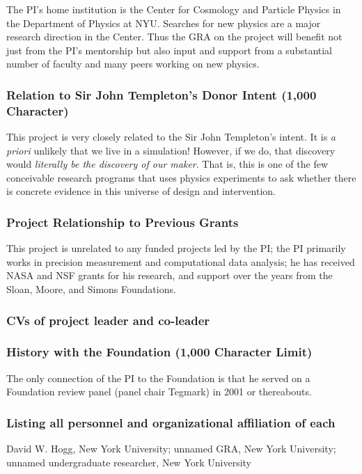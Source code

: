 \documentclass[12pt]{article}
\begin{document}
The PI's home institution is the Center for Cosmology and Particle Physics in the Department of Physics at NYU.
Searches for new physics are a major research direction in the Center.
Thus the GRA on the project will benefit not just from the PI's mentorship but also input and support from a substantial number of faculty and many peers working on new physics.

\subsubsection*{Relation to Sir John Templeton's Donor Intent (1,000 Character)}
This project is very closely related to the Sir John Templeton's intent.
It is \textsl{a priori} unlikely that we live in a simulation!
However, if we do, that discovery would \emph{literally be the discovery of our maker}.
That is, this is one of the few conceivable research programs that uses physics experiments to ask whether there is concrete evidence in this universe of design and intervention.

\subsubsection*{Project Relationship to Previous Grants}
This project is unrelated to any funded projects led by the PI;
the PI primarily works in precision measurement and computational data analysis; he has received NASA and NSF grants for his research, and support over the years from the Sloan, Moore, and Simons Foundations.

\subsubsection*{CVs of project leader and co-leader}

\subsubsection*{History with the Foundation (1,000 Character Limit)}
The only connection of the PI to the Foundation is that he served on a Foundation review panel (panel chair Tegmark) in 2001 or thereabouts.

\subsubsection*{Listing all personnel and organizational affiliation of each}
David W. Hogg, New York University; unnamed GRA, New York University; unnamed undergraduate researcher, New York University
\end{document}
